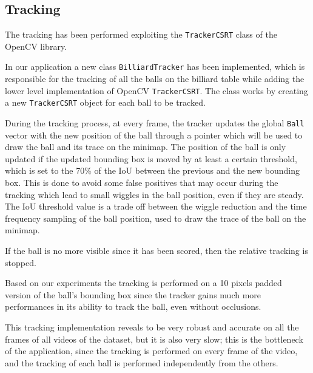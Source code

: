 \subsection{Tracking}
The tracking has been performed exploiting the \texttt{TrackerCSRT} class of the OpenCV library.

In our application a new class \texttt{BilliardTracker} has been implemented, which is responsible for the tracking of all the balls on the billiard table while adding the lower level implementation of OpenCV \texttt{TrackerCSRT}. The class works by creating a new \texttt{TrackerCSRT} object for each ball to be tracked.

During the tracking process, at every frame, the tracker updates the global \texttt{Ball} vector with the new position of the ball through a pointer which will be used to draw the ball and its trace on the minimap.
The position of the ball is only updated if the updated bounding box is moved by at least a certain threshold, which is set to the 70\% of the IoU between the previous and the new bounding box. This is done to avoid some false positives that may occur during the tracking which lead to small wiggles in the ball position, even if they are steady.
The IoU threshold value is a trade off between the wiggle reduction and the time frequency sampling of the ball position, used to draw the trace of the ball on the minimap.

If the ball is no more visible since it has been scored, then the relative tracking is stopped.

Based on our experiments the tracking is performed on a 10 pixels padded version of the ball's bounding box since the tracker gains much more performances in its ability to track the ball, even without occlusions.

This tracking implementation reveals to be very robust and accurate on all the frames of all videos of the dataset, but it is also very slow; this is the bottleneck of the application, since the tracking is performed on every frame of the video, and the tracking of each ball is performed independently from the others.
